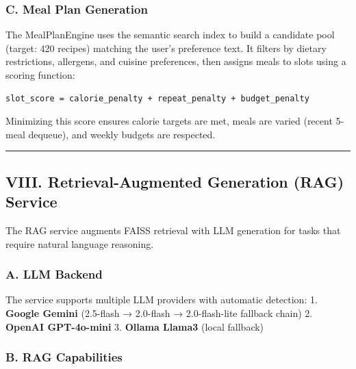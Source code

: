 \documentclass[
  10pt,
]{article}
\begin{document}
\subsubsection{C. Meal Plan Generation}\label{c.-meal-plan-generation}

The MealPlanEngine uses the semantic search index to build a candidate
pool (target: 420 recipes) matching the user's preference text. It
filters by dietary restrictions, allergens, and cuisine preferences,
then assigns meals to slots using a scoring function:

\begin{verbatim}
slot_score = calorie_penalty + repeat_penalty + budget_penalty
\end{verbatim}

Minimizing this score ensures calorie targets are met, meals are varied
(recent 5-meal dequeue), and weekly budgets are respected.

\begin{center}\rule{0.5\linewidth}{0.5pt}\end{center}

\subsection{VIII. Retrieval-Augmented Generation (RAG)
Service}\label{viii.-retrieval-augmented-generation-rag-service}

The RAG service augments FAISS retrieval with LLM generation for tasks
that require natural language reasoning.

\subsubsection{A. LLM Backend}\label{a.-llm-backend}

The service supports multiple LLM providers with automatic detection: 1.
\textbf{Google Gemini} (2.5-flash → 2.0-flash → 2.0-flash-lite fallback
chain) 2. \textbf{OpenAI GPT-4o-mini} 3. \textbf{Ollama Llama3} (local
fallback)

\subsubsection{B. RAG Capabilities}\label{b.-rag-capabilities}
\end{document}
